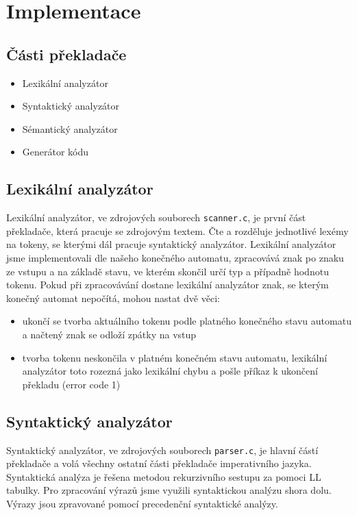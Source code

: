 \documentclass[a4paper, 11pt]{article}
\begin{document}
\section{Implementace}
\subsection{Části překladače}
\begin{itemize}
\item Lexikální analyzátor
\item Syntaktický analyzátor
\item Sémantický analyzátor
\item Generátor kódu
\end{itemize}

\subsection{Lexikální analyzátor}
Lexikální analyzátor, ve zdrojových souborech \verb|scanner.c|, je první část překladače, která pracuje se zdrojovým textem. Čte a rozděluje jednotlivé lexémy na tokeny, se kterými dál pracuje syntaktický analyzátor. Lexikální analyzátor jsme implementovali dle našeho konečného automatu, zpracovává znak po znaku ze vstupu a na základě stavu, ve kterém skončil určí typ a případně hodnotu tokenu. Pokud při zpracovávání dostane lexikální analyzátor znak, se kterým konečný automat nepočítá, mohou nastat dvě věci:
\begin{itemize}
\item ukončí se tvorba aktuálního tokenu podle platného konečného stavu automatu a načtený znak se odloží zpátky na vstup
\item tvorba tokenu neskončila v platném konečném stavu automatu, lexikální analyzátor toto rozezná jako lexikální chybu a pošle příkaz k ukončení překladu (error code 1)
\end{itemize}

\subsection{Syntaktický analyzátor}
Syntaktický analyzátor, ve zdrojových souborech \verb|parser.c|, je hlavní částí překladače a volá všechny ostatní části překladače imperativního jazyka. Syntaktická analýza je řešena metodou rekurzivního sestupu za pomoci LL tabulky. Pro zpracování výrazů jsme využili syntaktickou analýzu shora dolu. Výrazy jsou zpravované pomocí precedenční syntaktické analýzy.
\end{document}
